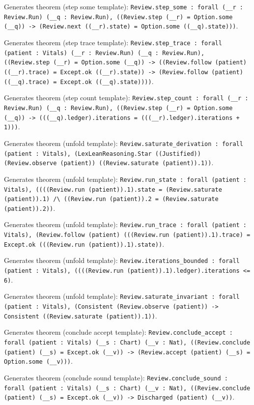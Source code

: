 \documentclass[11pt]{article}
\begin{document}
\noindent Generates theorem (step some template): \texttt{Review.step\_some : forall (\_\_r : Review.Run) (\_\_q : Review.Run), ((Review.step (\_\_r) = Option.some (\_\_q)) -> (Review.next ((\_\_r).state) = Option.some ((\_\_q).state)))}.\par
\noindent Generates theorem (step trace template): \texttt{Review.step\_trace : forall (patient : Vitals) (\_\_r : Review.Run) (\_\_q : Review.Run), ((Review.step (\_\_r) = Option.some (\_\_q)) -> ((Review.follow (patient) ((\_\_r).trace) = Except.ok ((\_\_r).state)) -> (Review.follow (patient) ((\_\_q).trace) = Except.ok ((\_\_q).state))))}.\par
\noindent Generates theorem (step count template): \texttt{Review.step\_count : forall (\_\_r : Review.Run) (\_\_q : Review.Run), ((Review.step (\_\_r) = Option.some (\_\_q)) -> (((\_\_q).ledger).iterations = (((\_\_r).ledger).iterations + 1)))}.\par
\noindent Generates theorem (unfold template): \texttt{Review.saturate\_derivation : forall (patient : Vitals), (LexLeanReasoning.Star ((Justified)) (Review.observe (patient)) ((Review.saturate (patient)).1))}.\par
\noindent Generates theorem (unfold template): \texttt{Review.run\_state : forall (patient : Vitals), ((((Review.run (patient)).1).state = (Review.saturate (patient)).1) /\textbackslash{} ((Review.run (patient)).2 = (Review.saturate (patient)).2))}.\par
\noindent Generates theorem (unfold template): \texttt{Review.run\_trace : forall (patient : Vitals), (Review.follow (patient) (((Review.run (patient)).1).trace) = Except.ok (((Review.run (patient)).1).state))}.\par
\noindent Generates theorem (unfold template): \texttt{Review.iterations\_bounded : forall (patient : Vitals), ((((Review.run (patient)).1).ledger).iterations <= 6)}.\par
\noindent Generates theorem (unfold template): \texttt{Review.saturate\_invariant : forall (patient : Vitals), (Consistent (Review.observe (patient)) -> Consistent ((Review.saturate (patient)).1))}.\par
\noindent Generates theorem (conclude accept template): \texttt{Review.conclude\_accept : forall (patient : Vitals) (\_\_s : Chart) (\_\_v : Nat), ((Review.conclude (patient) (\_\_s) = Except.ok (\_\_v)) -> (Review.accept (patient) (\_\_s) = Option.some (\_\_v)))}.\par
\noindent Generates theorem (conclude sound template): \texttt{Review.conclude\_sound : forall (patient : Vitals) (\_\_s : Chart) (\_\_v : Nat), ((Review.conclude (patient) (\_\_s) = Except.ok (\_\_v)) -> Discharged (patient) (\_\_v))}.\par
\end{document}

